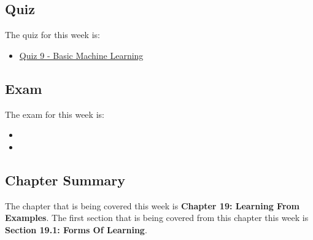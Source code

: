 \subsection{Quiz}

The quiz for this week is:

\begin{itemize}
    \item \href{https://applied.cs.colorado.edu/mod/quiz/view.php?id=60014}{Quiz 9 - Basic Machine Learning}
\end{itemize}

\subsection{Exam}

The exam for this week is:

\begin{itemize}
    \item {}
    \item {}
\end{itemize}

\subsection{Chapter Summary}

The chapter that is being covered this week is \textbf{Chapter 19: Learning From Examples}. The first section that is being covered from this chapter this week is \textbf{Section 19.1: Forms Of Learning}.

